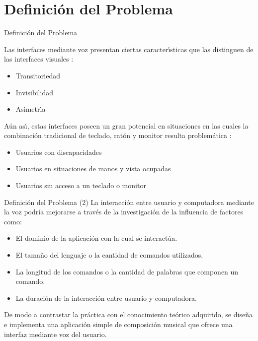 \section{Definici\'on del Problema}

\begin{frame}{Definici\'on del Problema}

Las interfaces mediante voz presentan ciertas caracter{\'\i}sticas que las
distinguen de las interfaces visuales \cite{GabrielVoice2007}:

\begin{itemize}
    \item Transitoriedad
    \item Invisibilidad
    \item Asimetr{\'\i}a
\end{itemize}
A\'un as{\'\i}, estas interfaces poseen un gran potencial en situaciones en las cuales la
combinaci\'on tradicional de teclado, rat\'on y monitor resulta problem\'atica \cite{NielsenVoice2003}:

\begin{itemize}
    \item Usuarios con discapacidades
    \item Usuarios en situaciones de manos y vista ocupadas
    \item Usuarios sin acceso a un teclado o monitor
\end{itemize}

\end{frame}

\begin{frame}{Definici\'on del Problema (2)}
La interacción entre usuario y computadora mediante la voz podría mejorarse
a través de la investigación de la influencia de factores como:

\begin{itemize}
    \item El dominio de la aplicaci\'on con la cual se interactúa.
    \item El tama\~no del lenguaje o la cantidad de comandos utilizados.
    \item La longitud de los comandos o la cantidad de palabras que componen un comando.
    \item La duraci\'on de la interacci\'on entre usuario y computadora.
\end{itemize}

De modo a contrastar la pr\'actica con el conocimiento te\'orico adquirido,
se diseña e implementa una aplicación simple de composición musical que ofrece una
interfaz mediante voz del usuario.

\end{frame}